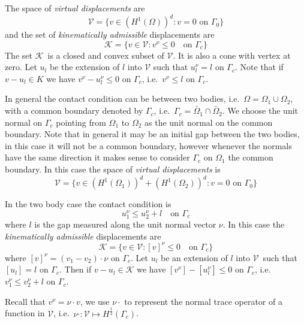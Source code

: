 \documentclass[12pt,a4paper]{article}
\numberwithin{equation}{section}
\numberwithin{table}{section}
\numberwithin{figure}{section}
\newcommand{\half}{\ensuremath{\frac{1}{2}}}
\newcommand{\HenO}{H^1(\Omega)}
\newcommand{\HenOne}{H^1(\Omega_1)}
\newcommand{\HenTwo}{H^1(\Omega_2)}
\newcommand{\V}{\ensuremath{\mathcal{V}}}
\newcommand{\K}{\ensuremath{\mathcal{K}}}
\begin{document}
The space of \emph{virtual displacements} are
\begin{equation}
  \label{eq:VirtualDisplacementsUni}
  \V = \{v\in(\HenO)^d \colon v = 0 \text{ on }\Gamma_0 \}
\end{equation}
and the set of \emph{kinematically admissible} displacements are
\begin{equation}
  \label{eq:KinematicallyAdmisible}
  \K = \{v\in \V \colon v^\nu \le 0 \quad\text{on }\Gamma_c \}
\end{equation}
The set \K\ is a closed and convex subset of \V. It is also a cone
with vertex at zero.  Let $u_l$ be the extension of $l$ into $\V$ such
that $u_l^\nu = l$ on $\Gamma_c$.  Note that if $v-u_l\in K$ we have
$v^\nu-u_l^\nu \le 0$ on $\Gamma_c$, i.e.\ $v^\nu \le l$ on
$\Gamma_c$.

In general the contact condition can be between two bodies, i.e.\ $\Omega =
\Omega_1\cup\Omega_2$, with a common boundary denoted by $\Gamma_c$, i.e.\ $\Gamma_c =
\bar{\Omega}_1\cap\bar{\Omega}_2$.  We choose the unit normal on $\Gamma_c$ pointing from
$\Omega_1$ to $\Omega_2$ as the unit normal on the common boundary.  Note that in general
it may be an initial gap between the two bodies, in this case it will not be a common
boundary, however whenever the normals have the same direction it makes sense to consider
$\Gamma_c$ on $\Omega_1$ the common boundary.  In this case the space of \emph{virtual
  displacements} is 
\begin{equation}
  \label{eq:VirtualDisplacements}
  \V = \{v\in(\HenOne)^d+(\HenTwo)^d \colon v = 0 \text{ on }\Gamma_0 \}
\end{equation}

In the two body case the contact condition is
\begin{equation}
  u_1^\nu \le u_2^\nu + l \quad \text{on $\Gamma_c$}
\end{equation}
where $l$ is the gap measured along the unit normal vector $\nu$.  In this case the
\emph{kinematically admissible} displacements are
\begin{equation}
  \label{eq:KinematicallyAdmisibleGap}
  \K = \{v\in \V \colon [v]^\nu \le 0 \quad\text{on }\Gamma_c \}
\end{equation}
where $[v]^\nu = (v_1 - v_2)\cdot \nu$ on $\Gamma_c$.  Let $u_l$ be an extension of $l$ into
\V\ such that $[u_l] = l$ on $\Gamma_c$.  Then if $v-u_l \in \K$ we have
$[v^\nu]-[u_l^\nu] \le 0$ on $\Gamma_c$, i.e.\ $v_1^\nu \le v_2^\nu + l$ on $\Gamma_c$.

Recall that $v^\nu = \nu\cdot v$, we use $\nu\cdot$ to represent the normal trace operator
of a function in \V, i.e.\ $\nu\cdot : \V \mapsto H^{\half}(\Gamma_c)$.
\end{document}
